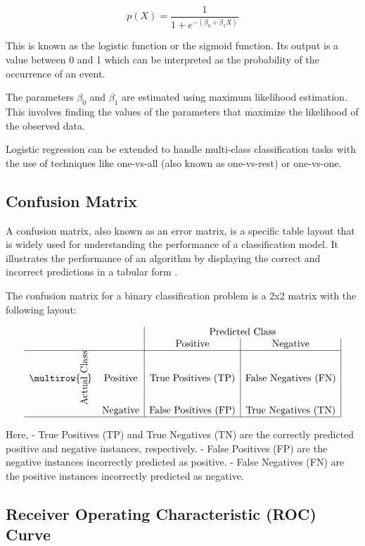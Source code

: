 \documentclass{cernatsnote}
\begin{document}
\[
p(X) = \frac{1}{1 + e^{-(\beta_0 + \beta_1 X)}}
\]

This is known as the logistic function or the sigmoid function. Its output is a value between 0 and 1 which can be interpreted as the probability of the occurrence of an event.

The parameters \( \beta_0 \) and \( \beta_1 \) are estimated using maximum likelihood estimation. This involves finding the values of the parameters that maximize the likelihood of the observed data.

Logistic regression can be extended to handle multi-class classification tasks with the use of techniques like one-vs-all (also known as one-vs-rest) or one-vs-one.


\subsection{Confusion Matrix}

A confusion matrix, also known as an error matrix, is a specific table layout that is widely used for understanding the performance of a classification model. It illustrates the performance of an algorithm by displaying the correct and incorrect predictions in a tabular form \cite{powers2011evaluation}.

The confusion matrix for a binary classification problem is a 2x2 matrix with the following layout:

\[
\begin{array}{cc|c|c|}
 & & \multicolumn{2}{c}{\text{Predicted Class}} \\
 & & \text{Positive} & \text{Negative} \\
\hline
\multirow{\rotatebox[origin=c]{90}{\text{Actual Class}}} & \text{Positive} & \text{True Positives (TP)} & \text{False Negatives (FN)} \\
 & \text{Negative} & \text{False Positives (FP)} & \text{True Negatives (TN)} \\
\hline
\end{array}
\]

Here, 
- True Positives (TP) and True Negatives (TN) are the correctly predicted positive and negative instances, respectively.
- False Positives (FP) are the negative instances incorrectly predicted as positive.
- False Negatives (FN) are the positive instances incorrectly predicted as negative.

\subsection{Receiver Operating Characteristic (ROC) Curve}
\end{document}
